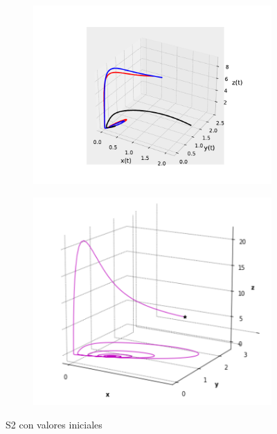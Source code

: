 \documentclass{wscpaperproc}
\theoremstyle{wsc}
\begin{document}
\begin{figure}[h]
	\centering
	\begin{subfigure}[b]{0.5\textwidth}
		\centering
		\includegraphics[width=\textwidth]{Simulations/S23d.pdf}
	
		\label{fig:comparativa3D2}
	\end{subfigure}%
	\begin{subfigure}[b]{0.5\textwidth}
		\centering
		\includegraphics[width=\textwidth]{GraficasPaper/S2[3d1].png}
		\label{fig:comparativa3D22}
	\end{subfigure}
	\caption{S2 con valores iniciales}

	\label{fig:comparacion8}
\end{figure}
\end{document}

